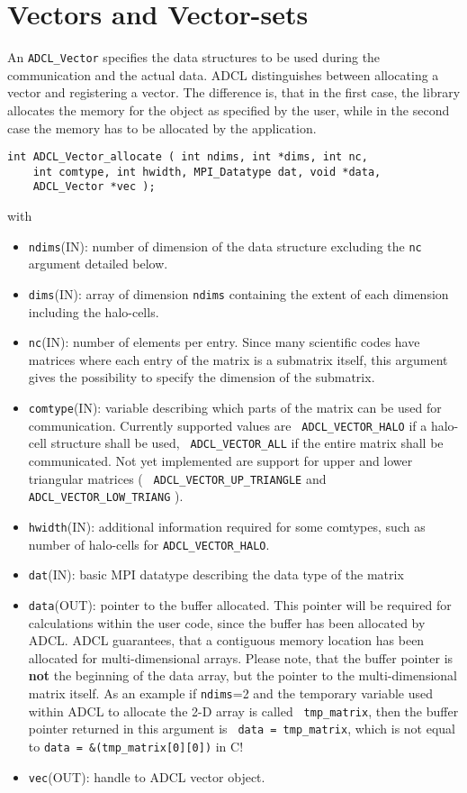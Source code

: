 \section{Vectors and Vector-sets}

An {\tt ADCL\_Vector} specifies the data structures to be used during the
communication and the actual data. ADCL distinguishes between allocating a
vector and registering a vector. The difference is, that in the first case,
the library allocates the memory for the object as specified by the user,
while in the second case the memory has to be allocated by the application.

\begin{verbatim}
int ADCL_Vector_allocate ( int ndims, int *dims, int nc, 
    int comtype, int hwidth, MPI_Datatype dat, void *data, 
    ADCL_Vector *vec );
\end{verbatim}
with
\begin{itemize}
\item {\tt ndims}(IN): number of dimension of the data structure excluding the
  {\tt nc} argument detailed below.
\item {\tt dims}(IN): array of dimension {\tt ndims} containing the extent of
  each dimension including the halo-cells.
\item {\tt nc}(IN): number of elements per entry. Since many scientific codes
  have matrices where each entry of the matrix is a submatrix itself, this
  argument gives the possibility to specify the dimension of the submatrix.
\item {\tt comtype}(IN): variable describing which parts of the matrix can be
  used for communication. Currently supported values are {\tt
    ADCL\_VECTOR\_HALO} if a halo-cell structure shall be used, {\tt
    ADCL\_VECTOR\_ALL} if the entire matrix shall be communicated. Not yet
  implemented are support for upper and lower triangular matrices ( {\tt
    ADCL\_VECTOR\_UP\_TRIANGLE} and {\tt ADCL\_VECTOR\_LOW\_TRIANG} ).
\item {\tt hwidth}(IN): additional information required for some comtypes,
  such as number of halo-cells for {\tt ADCL\_VECTOR\_HALO}.
\item {\tt dat}(IN): basic MPI datatype describing the data type of the matrix
\item {\tt data}(OUT): pointer to the buffer allocated. This pointer will be
  required for calculations within the user code, since the buffer has been
  allocated by ADCL. ADCL guarantees, that a contiguous memory location has
  been allocated for multi-dimensional arrays. Please note, that the buffer
  pointer is {\bf not} the beginning of the data array, but the pointer to the
  multi-dimensional matrix itself. As an example if {\tt ndims}=2 and the
  temporary variable used within ADCL to allocate the 2-D array is called {\tt
    tmp\_matrix}, then the buffer pointer returned in this argument is {\tt
    data = tmp\_matrix}, which is not equal to {\tt data =
    \&(tmp\_matrix[0][0])} in C!
\item {\tt vec}(OUT): handle to ADCL vector object.
\end{itemize}
